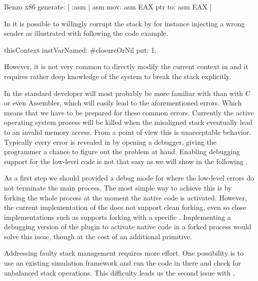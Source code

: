 \begin{stcode}[caption={\B code possibly leading memory access violation.}]{}
Benzo x86 generate: [ :asm |
	asm mov: asm EAX ptr to: asm EAX ]
\end{stcode}

\noindent In \PH it is possible to willingly corrupt the stack by for instance injecting a wrong sender as illustrated with following the code example.
%
\begin{stcode}[label=lst:benzo-pharo-stack-corruption]{}
thisContext instVarNamed: #closureOrNil put: 1.
\end{stcode}
%
However, it is not very common to directly modify the current context in \PH and it requires rather deep knowledge of the system to break the stack explicitly.

In \B the standard developer will most probably be more familiar with \PH than with C or even Assembler, which will easily lead to the aforementioned errors.
Which means that we have to be prepared for these common errors.
Currently the active operating system process will be killed when the misaligned stack eventually lead to an invalid memory access.
From a \PH point of view this is unacceptable behavior.
Typically every error is revealed in \PH by opening a debugger, giving the programmer a chance to figure out the problem at hand.
Enabling debugging support for the low-level \B code is not that easy as we will show in the following .

As a first step we should provided a debug mode for \B where the low-level errors do not terminate the main process.
The most simple way to achieve this is by forking the whole \VM process at the moment the native \B code is activated.
However, the current implementation of the \PH \VM does not support clean forking, even so close implementations such as \Squeak supports forking with a specific .
Implementing a debugging version of the \B plugin to activate native code in a forked process would solve this issue, though at the cost of an additional primitive.

Addressing faulty stack management requires more effort.
One possibility is to use an existing \ASM simulation framework and run the code in there and check for unbalanced stack operations.
This difficulty leads us the second issue with \B.

